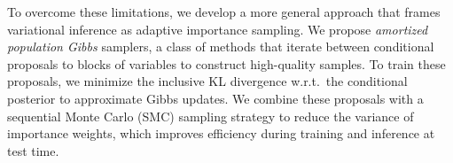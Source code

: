 \documentclass{article}
\theoremstyle{definition}
\begin{document}
To overcome these limitations, we develop a more general approach that frames variational inference as adaptive importance sampling. We propose \emph{amortized population Gibbs} samplers, a class of methods that iterate between conditional proposals to blocks of variables to construct high-quality samples. To train these proposals, we minimize the inclusive KL divergence w.r.t.~the conditional posterior to approximate Gibbs updates. We combine these proposals with a sequential Monte Carlo (SMC) sampling strategy to reduce the variance of importance weights, which improves efficiency during training and inference at test time.





\end{document}
